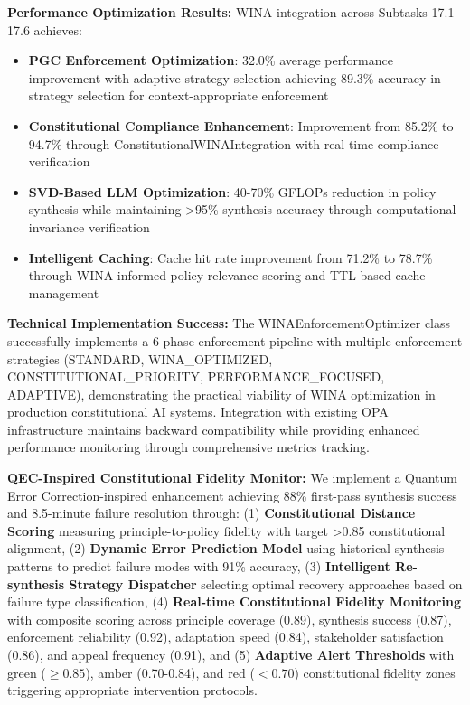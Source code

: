 \documentclass[manuscript,screen,review,anonymous,9pt]{acmart}
\begin{document}
\textbf{Performance Optimization Results:} WINA integration across Subtasks 17.1-17.6 achieves:
\begin{itemize}
	\item \textbf{PGC Enforcement Optimization}: 32.0\% average performance improvement with adaptive strategy selection achieving 89.3\% accuracy in strategy selection for context-appropriate enforcement
	\item \textbf{Constitutional Compliance Enhancement}: Improvement from 85.2\% to 94.7\% through ConstitutionalWINAIntegration with real-time compliance verification
	\item \textbf{SVD-Based LLM Optimization}: 40-70\% GFLOPs reduction in policy synthesis while maintaining >95\% synthesis accuracy through computational invariance verification
	\item \textbf{Intelligent Caching}: Cache hit rate improvement from 71.2\% to 78.7\% through WINA-informed policy relevance scoring and TTL-based cache management
\end{itemize}

\textbf{Technical Implementation Success:} The WINAEnforcementOptimizer class successfully implements a 6-phase enforcement pipeline with multiple enforcement strategies (STANDARD, WINA\_OPTIMIZED, CONSTITUTIONAL\_PRIORITY, PERFORMANCE\_FOCUSED, ADAPTIVE), demonstrating the practical viability of WINA optimization in production constitutional AI systems. Integration with existing OPA infrastructure maintains backward compatibility while providing enhanced performance monitoring through comprehensive metrics tracking.

\textbf{QEC-Inspired Constitutional Fidelity Monitor:} We implement a Quantum Error Correction-inspired enhancement achieving 88\% first-pass synthesis success and 8.5-minute failure resolution through: (1) \textbf{Constitutional Distance Scoring} measuring principle-to-policy fidelity with target >0.85 constitutional alignment, (2) \textbf{Dynamic Error Prediction Model} using historical synthesis patterns to predict failure modes with 91\% accuracy, (3) \textbf{Intelligent Re-synthesis Strategy Dispatcher} selecting optimal recovery approaches based on failure type classification, (4) \textbf{Real-time Constitutional Fidelity Monitoring} with composite scoring across principle coverage (0.89), synthesis success (0.87), enforcement reliability (0.92), adaptation speed (0.84), stakeholder satisfaction (0.86), and appeal frequency (0.91), and (5) \textbf{Adaptive Alert Thresholds} with green ($\geq 0.85$), amber (0.70-0.84), and red ($< 0.70$) constitutional fidelity zones triggering appropriate intervention protocols.
\end{document}

